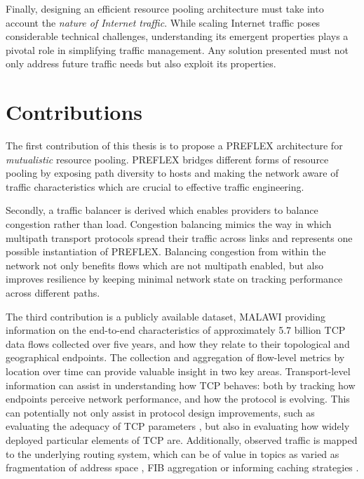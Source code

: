 Finally, designing an efficient resource pooling architecture must take into account the \emph{nature of Internet traffic}.
While scaling Internet traffic poses considerable technical challenges, understanding its emergent properties plays a pivotal role in simplifying traffic management.
Any solution presented must not only address future traffic needs but also exploit its properties.

\section{Contributions}

The first contribution of this thesis is to propose a \ac{PREFLEX} architecture for \emph{mutualistic} resource pooling.
\ac{PREFLEX} bridges different forms of resource pooling by exposing path diversity to hosts and making the network aware of traffic characteristics which are crucial to effective traffic engineering.

Secondly, a traffic balancer is derived which enables providers to balance congestion rather than load.
Congestion balancing mimics the way in which multipath transport protocols spread their traffic across links and represents one possible instantiation of \ac{PREFLEX}.
Balancing congestion from within the network not only benefits flows which are not multipath enabled, but also improves resilience by keeping minimal network state on tracking performance across different paths.

The third contribution is a publicly available dataset, \ac{MALAWI} providing information on the end-to-end characteristics of approximately 5.7 billion TCP data flows collected over five years, and how they relate to their topological and geographical endpoints. The collection and aggregation of flow-level metrics by location over time can provide valuable insight in two key areas. Transport-level information can assist in understanding how TCP behaves: both by tracking how endpoints perceive network performance, and how the protocol is evolving. This can potentially not only assist in protocol design improvements, such as evaluating the adequacy of TCP parameters \cite{Dukkipati:2010p160}, but also in evaluating how widely deployed particular elements of TCP are. Additionally, observed traffic is mapped to the underlying routing system, which can be of value in topics as varied as fragmentation of address space \cite{Cittadini:2010p431}, FIB aggregation \cite{Ballani:2008p199} or informing caching strategies \cite{Psaras:2011p487}.

